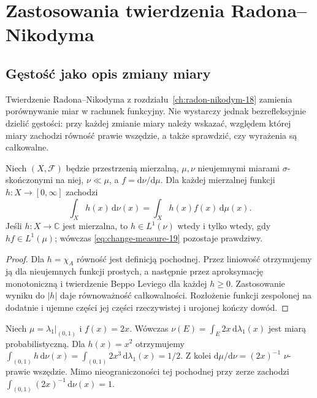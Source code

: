 \chapter{Zastosowania twierdzenia Radona--Nikodyma}
\label{ch:rn-applications-19}

\section{Gęstość jako opis zmiany miary}
Twierdzenie Radona--Nikodyma z rozdziału~\ref{ch:radon-nikodym-18}
zamienia porównywanie miar w rachunek funkcyjny. Nie wystarczy jednak
bezrefleksyjnie dzielić gęstości: przy każdej zmianie miary należy
wskazać, względem której miary zachodzi równość prawie wszędzie,
a także sprawdzić, czy wyrażenia są całkowalne.

\begin{twierdzenie}
\label{thm:change-measure-19}
Niech $(X,\mathcal F)$ będzie przestrzenią mierzalną,
$\mu,\nu$ nieujemnymi miarami $\sigma$-skończonymi na niej,
$\nu\ll\mu$, a $f=\mathrm d\nu/\mathrm d\mu$.
Dla każdej mierzalnej funkcji $h:X\to[0,\infty]$ zachodzi
\begin{equation}\label{eq:change-measure-19}
 \int_X h(x)\,\mathrm d\nu(x)
 =\int_X h(x)f(x)\,\mathrm d\mu(x).
\end{equation}
Jeśli $h:X\to\mathbb C$ jest mierzalna, to $h\in L^1(\nu)$
wtedy i tylko wtedy, gdy $hf\in L^1(\mu)$; wówczas
\eqref{eq:change-measure-19} pozostaje prawdziwy.
\end{twierdzenie}
\begin{proof}
Dla $h=\chi_A$ równość jest definicją pochodnej.
Przez liniowość otrzymujemy ją dla nieujemnych funkcji prostych,
a następnie przez aproksymację monotoniczną i twierdzenie Beppo
Leviego dla każdej $h\ge0$. Zastosowanie wyniku do $|h|$
daje równoważność całkowalności. Rozłożenie funkcji zespolonej
na dodatnie i ujemne części jej części rzeczywistej i urojonej
kończy dowód.
\end{proof}

\begin{przyklad}
Niech $\mu=\lambda_1|_{(0,1)}$ i $f(x)=2x$.
Wówczas $\nu(E)=\int_E 2x\,\mathrm d\lambda_1(x)$ jest
miarą probabilistyczną. Dla $h(x)=x^2$ otrzymujemy
$\int_{(0,1)}h\,\mathrm d\nu(x)
=\int_{(0,1)}2x^3\,\mathrm d\lambda_1(x)=1/2$.
Z kolei $\mathrm d\mu/\mathrm d\nu=(2x)^{-1}$
$\nu$-prawie wszędzie. Mimo nieograniczoności tej pochodnej
przy zerze zachodzi
$\int_{(0,1)}(2x)^{-1}\,\mathrm d\nu(x)=1$.
\end{przyklad}

